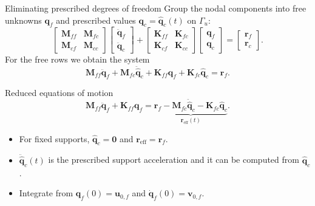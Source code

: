 \documentclass[aspectratio=169]{beamer}
\begin{document}
\begin{frame}{Eliminating prescribed degrees of freedom}
  \small Group the nodal components into free unknowns $\mathbf q_f$ and prescribed
  values $\mathbf q_c=\hat{\mathbf q}_c(t)$ on $\Gamma_u$:
  \[
    \begin{bmatrix}\mathbf M_{ff}&\mathbf M_{fc}\\\mathbf M_{cf}&\mathbf M_{cc}\end{bmatrix}
    \begin{bmatrix} \ddot{\mathbf q}_f\\ \ddot{\mathbf q}_c\end{bmatrix}+\begin{bmatrix}\mathbf K_{ff}&\mathbf K_{fc}\\\mathbf K_{cf}&\mathbf K_{cc}\end{bmatrix}
    \begin{bmatrix}\mathbf q_f\\\mathbf q_c\end{bmatrix}
    =\begin{bmatrix}\mathbf r_f\\\mathbf r_c\end{bmatrix}.
  \]
  For the free rows we obtain the system
  \[
    \mathbf M_{ff}\ddot{\mathbf q}_f + \mathbf M_{fc}\ddot{\hat{\mathbf q}}_c
    + \mathbf K_{ff}\mathbf q_f + \mathbf K_{fc}\hat{\mathbf q}_c = \mathbf r_f .
  \]
  \vspace{-0.4cm}
  \begin{block}{Reduced equations of motion}
    \[
      \mathbf M_{ff}\ddot{\mathbf q}_f+\mathbf K_{ff}\mathbf q_f
      =\underbrace{\mathbf r_f-\mathbf M_{fc}\ddot{\hat{\mathbf q}}_c
        -\mathbf K_{fc}\hat{\mathbf q}_c}_{\mathbf r_{\mathrm{eff}}(t)} .
    \]
  \end{block}
  \begin{itemize}
    \item For fixed supports, $\hat{\mathbf q}_c=\mathbf 0$ and $\mathbf r_{\mathrm{eff}}=\mathbf r_f$.
    \item \(\ddot{\hat{\mathbf q}}_c(t)\) is the prescribed support acceleration and it can be computed from $\hat{\mathbf q}_c$.
    \item Integrate from $\mathbf q_f(0)=\mathbf u_{0,f}$ and $\dot{\mathbf q}_f(0)=\mathbf v_{0,f}$.
  \end{itemize}
\end{frame}
\end{document}
